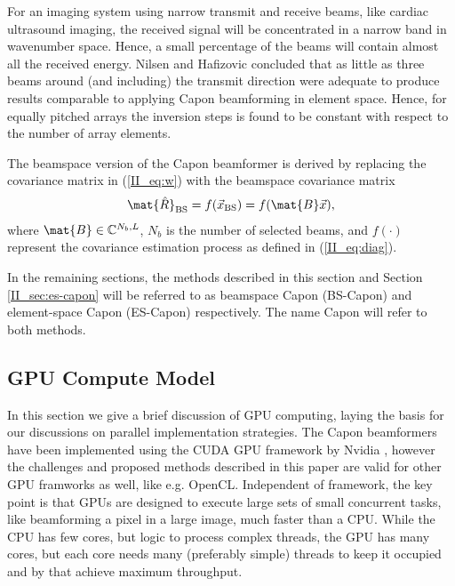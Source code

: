 For an imaging system using narrow transmit and receive beams, like cardiac ultrasound imaging, the received signal will be concentrated in a narrow band in wavenumber space. Hence, a small percentage of the beams will contain almost all the received energy. Nilsen and Hafizovic concluded that as little as three beams around (and including) the transmit direction were adequate to produce results comparable to applying Capon beamforming in element space. Hence, for equally pitched arrays the inversion steps is found to be constant with respect to the number of array elements.

The beamspace version of the Capon beamformer is derived by replacing the covariance matrix in (\ref{II_eq:w}) with the beamspace covariance matrix 
\begin{align}
\mat{\hat{R}}_\text{BS} = f(\vec{x}_\text{BS}) = f(\mat{B}\vec{x}), 
\end{align}
where $\mat{B} \in \mathbb{C}^{N_b,L}$, $N_b$ is the number of selected beams, and $f(\cdot)$ represent the covariance estimation process as defined in (\ref{II_eq:diag}).

In the remaining sections, the methods described in this section and Section \ref{II_sec:es-capon} will be referred to as beamspace Capon (BS-Capon) and element-space Capon (ES-Capon) respectively. The name Capon will refer to both methods. 

\subsection{GPU Compute Model}



In this section we give a brief discussion of GPU computing, laying the basis for our discussions on parallel implementation strategies. The Capon beamformers have been implemented using the CUDA GPU framework by Nvidia \cite{Nvidia2013}, however the challenges and proposed methods described in this paper are valid for other GPU framworks as well, like e.g. OpenCL. Independent of framework, the key point is that GPUs are designed to execute large sets of small concurrent tasks, like beamforming a pixel in a large image, much faster than a CPU. While the CPU has few cores, but logic to process complex threads, the GPU has many cores, but each core needs many (preferably simple) threads to keep it occupied and by that achieve maximum throughput.

